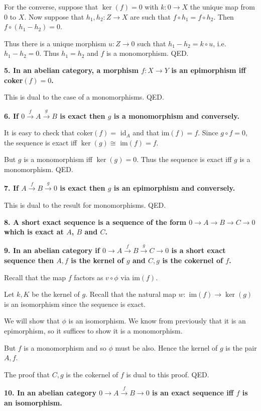 \documentclass[12pt]{article}
\begin{document}
For the converse, suppose that $\ker(f) = 0$ with $k : 0 \to X$ the unique map from $0$ to $X$. Now suppose that $h_1, h_2 : Z \to X$ are such that $f\circ h_1 = f\circ h_2$. Then $f\circ (h_1 - h_2) = 0$.

Thus there is a unique morphism $u : Z \to 0$ such that $h_1 - h_2 = k\circ u$, i.e. $h_1 - h_2 = 0$. Thus $h_1 = h_2$ and $f$ is a monomorphism. QED.

\textbf{5. In an abelian category, a morphism $f : X \to Y$ is an epimorphism iff coker$(f) = 0$.}

This is dual to the case of a monomorphisms. QED.

\textbf{6. If $0 \overset{f}{\rightarrow} A \overset{g}{\rightarrow} B$ is exact then $g$ is a monomorphism and conversely.}

It is easy to check that coker$(f) =$ id$_A$ and that im$(f) = f$. Since $g\circ f = 0$, the sequence is exact iff $\ker(g) \cong$ im$(f) = f$.

But $g$ is a monomorphism iff $\ker(g) = 0$. Thus the sequence is exact iff $g$ is a monomorphism. QED.

\textbf{7. If $A \overset{f}{\rightarrow} B \overset{g}{\rightarrow} 0$ is exact then $g$ is an epimorphism and conversely.}

This is dual to the result for monomorphisms. QED.

\textbf{8. A short exact sequence is a sequence of the form $0 \rightarrow A \rightarrow B \rightarrow C \rightarrow 0$ which is exact at $A$, $B$ and $C$.}

\textbf{9. In an abelian category if $0 \rightarrow A \overset{f}{\rightarrow} B \overset{g}{\rightarrow} C \rightarrow 0$ is a short exact sequence then $A, f$ is the kernel of $g$ and $C, g$ is the cokernel of $f$.}

Recall that the map $f$ factors as $v\circ \phi$ via im$(f)$.

Let $k, K$ be the kernel of $g$. Recall that the natural map $w :$ im$(f) \to \ker(g)$ is an isomorphism since the sequence is exact.

We will show that $\phi$ is an isomorphism. We know from previously that it is an epimorphism, so it suffices to show it is a monomorphism.

But $f$ is a monomorphism and so $\phi$ must be also. Hence the kernel of $g$ is the pair $A, f$.

The proof that $C, g$ is the cokernel of $f$ is dual to this proof. QED.

\textbf{10. In an abelian category $0 \rightarrow A \overset{f}{\rightarrow} B \rightarrow 0$ is an exact sequence iff $f$ is an isomorphism.}
\end{document}
